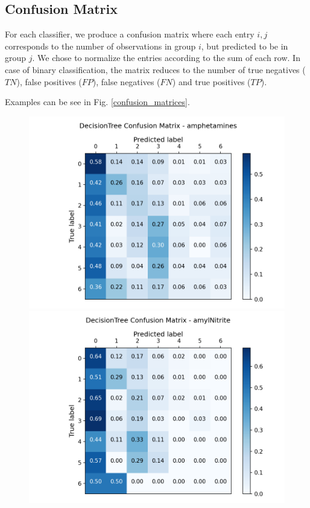 \documentclass{article}
\begin{document}
\subsection{Confusion Matrix}
For each classifier, we produce a confusion matrix where each entry $i,j$ corresponds to the number of observations in group $i$, but predicted to be in group $j$. We chose to normalize the entries according to the sum of each row.
In case of binary classification, the matrix reduces to the number of true negatives ($TN$), false positives ($FP$), false negatives ($FN$) and true positives ($TP$).

Examples can be see in Fig. \ref{confusion_matrices}.





\begin{figure}[h!]
	\centering
	\begin{minipage}[b]{0.49\textwidth}
		\includegraphics[width=\textwidth]{Plots/m2.png}

	\end{minipage}
	\begin{minipage}[b]{0.49\textwidth}
		\includegraphics[width=\textwidth]{Plots/m1.png}


\end{minipage}
\end{figure}
\end{document}
